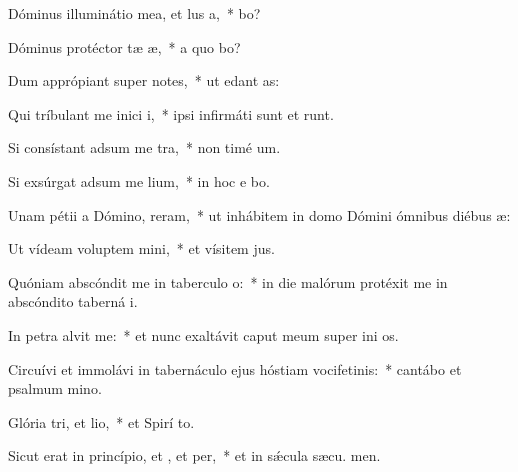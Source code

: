 \item Dóminus illuminátio mea, et lus a,~*  bo?
\item Dóminus protéctor tæ æ,~* a quo bo?
\item Dum apprópiant super  notes,~* ut edant  as:
\item Qui tríbulant me inici i,~* ipsi infirmáti sunt et runt.
\item Si consístant adsum me tra,~* non timé  um.
\item Si exsúrgat adsum me lium,~* in hoc e bo.
\item Unam pétii a Dómino,  reram,~* ut inhábitem in domo Dómini ómnibus diébus  æ:
\item Ut vídeam voluptem mini,~* et vísitem  jus.
\item Quóniam abscóndit me in taberculo o:~* in die malórum protéxit me in abscóndito taberná i.
\item In petra alvit me:~* et nunc exaltávit caput meum super ini os.
\item Circuívi et immolávi in tabernáculo ejus hóstiam vocifetinis:~* cantábo et psalmum  mino.
\item Glória tri, et lio,~* et Spirí to.
\item Sicut erat in princípio, et , et per,~* et in sǽcula sæcu. men.
